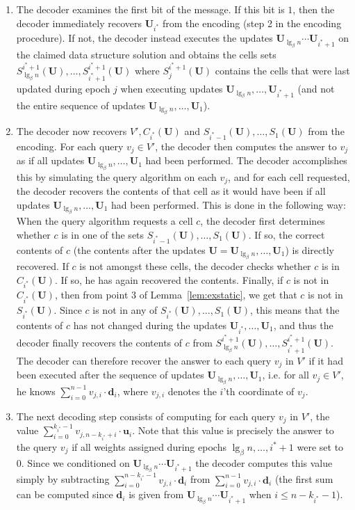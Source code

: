 \documentclass[letterpaper]{article}
\newcommand{\rdelta}{\textbf{d}}
\newcommand{\is}{{i^*}}
\newcommand{\uv}{\textbf{u}}
\newcommand{\U}{\textbf{U}}
\begin{document}
\begin{enumerate}
\item The decoder examines the first bit of the message. If this bit
  is $1$, then the decoder immediately recovers $\U_\is$ from the
  encoding (step 2 in the encoding procedure). If not, the decoder instead
  executes the updates $\U_{\lg_\beta n} \cdots \U_{\is+1}$ on
  the claimed data structure solution and obtains the cells sets
  $S_{\lg_\beta n}^{\is+1}(\U),\dots,S_{\is+1}^{\is+1}(\U)$ where
  $S_j^{\is+1}(\U)$ contains the cells
  that were last updated during epoch $j$ when executing updates $\U_{\lg_\beta n}, \dots,
  \U_{\is+1}$ (and not the entire sequence of updates
  $\U_{\lg_\beta n}, \dots, \U_1$).

\item The decoder now recovers $V',C_\is(\U)$ and
  $S_{\is-1}(\U),\dots,S_1(\U)$ from the encoding. For each query $v_j
  \in V'$, the decoder then computes the answer to $v_j$ as if all
  updates $\U_{\lg_\beta n},\dots, \U_1$ had been performed. The
  decoder accomplishes this by simulating the query algorithm on each
  $v_j$, and for each cell requested, the decoder recovers the
  contents of that cell as it would have been if all updates
  $\U_{\lg_\beta n},\dots, \U_1$ had been performed. This is done in
  the following way: When the query algorithm requests a cell $c$, the
  decoder first determines whether $c$ is in one of the sets
  $S_{\is-1}(\U),\dots,S_1(\U)$. If so, the correct contents of $c$
  (the contents after the updates $\U=\U_{\lg_\beta n}, \dots, \U_1$)
  is directly recovered. If $c$ is not amongst these cells, the
  decoder checks whether $c$ is in $C_\is(\U)$. If so, he has again
  recovered the contents. Finally, if $c$ is not in $C_\is(\U)$, then
  from point 3 of Lemma~\ref{lem:exstatic}, we get that $c$ is not in
  $S_\is(\U)$. Since $c$ is not in any of $S_\is(\U),\dots,S_1(\U)$,
  this means that the contents of $c$ has not changed during the
  updates $\U_\is, \dots, \U_1$, and thus the decoder finally recovers
  the contents of $c$ from $S_{\lg_\beta
    n}^{\is+1}(\U),\dots,S_{\is+1}^{\is+1}(\U)$. The decoder can
  therefore recover the answer to each query $v_j$ in $V'$ if it had
  been executed after the sequence of updates $\U_{\lg_\beta n},
  \dots, \U_1$, i.e. for all $v_j \in V'$, he knows $\sum_{i=0}^{n-1}
  v_{j,i} \cdot \rdelta_i$, where $v_{j,i}$ denotes the $i$'th
  coordinate of $v_j$.

\item The next decoding step consists of computing for each query
  $v_j$ in $V'$, the value $\sum_{i=0}^{k_\is-1} v_{j,n-k_\is+i} \cdot
  \uv_i$. Note that this value is precisely the answer to the query
  $v_j$ if all weights assigned during epochs $\lg_\beta
  n,\dots,\is+1$ were set to $0$. Since we conditioned on
  $\U_{\lg_\beta n} \cdots \U_{\is+1}$ the decoder computes this value
  simply by subtracting $\sum_{i=0}^{n-k_\is-1} v_{j,i} \cdot \rdelta_i$
  from $\sum_{i=0}^{n-1} v_{j,i} \cdot \rdelta_i$ (the first sum can
  be computed since $\rdelta_i$ is given from $\U_{\lg_\beta n} \cdots
  \U_{\is+1}$ when $i \leq n-k_\is - 1$).


\end{enumerate}
\end{document}
